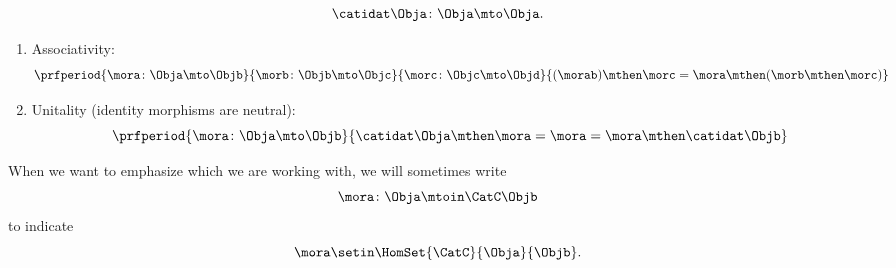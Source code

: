 \begin{ctdefinition}[Category]
\begin{body}
\begin{enumerate}
\begin{equation}
                      \catidat\Obja \colon \Obja \mto \Obja.
                  \end{equation}
        \end{enumerate}
        \condit
        \begin{enumerate}
            \item \label{category-associativity}
                  Associativity: 
                  \begin{equation}\label{eq:category-associativity}
                      \prfperiod{
                          \mora\colon \Obja \mto \Objb
                      }{
                          \morb\colon \Objb \mto \Objc
                      }{
                          \morc\colon \Objc \mto \Objd
                      }{
                          (\morab)
                          \mthen \morc= \mora \mthen (\morb \mthen \morc)
                      }
                  \end{equation}
            \item \label{category-unitality}
                  Unitality (identity morphisms are neutral):                                    
                  \begin{equation}\label{eq:category-unitality}
                      \prfperiod{
                          \mora\colon \Obja \mto \Objb
                      }{
                          \catidat\Obja \mthen \mora = \mora = \mora \mthen \catidat\Objb
                      }
                  \end{equation}
        \end{enumerate}
    \end{body}
\end{ctdefinition}






\begin{remark}
When we want to emphasize which  we are working with, we will sometimes write
              \begin{equation}
                  \mora \colon \Obja \mtoin\CatC \Objb
              \end{equation}
              to indicate
              \begin{equation}
                  \mora \setin \HomSet{\CatC}{\Obja}{\Objb}.
              \end{equation}
\end{remark}



